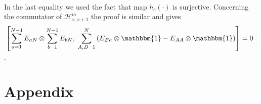 \documentclass[10pt]{article}
\numberwithin{equation}{section}
\numberwithin{equation}{subsection}
\newcommand{\dt}{\;.}
\begin{document}
{\begin{align*}
\end{align*}
In the last equality we used the fact that map $h_{c}(\cdot)$ is surjective. 
Concerning the commutator of $\mathcal{H}_{x,x+1}^{m}$ the proof is similar and gives
\begin{equation}
	\left[\sum_{a=1}^{N-1}E_{aN}\otimes \sum_{b=1}^{N-1}E_{bN},\;\sum_{A,B=1}^{N}\left(E_{B a}\otimes \mathbbm{1}-E_{AA}\otimes \mathbbm{1}\right)\right]=0\dt
\end{equation} 
\begin{flushright}
	$\square$
\end{flushright}













\appendix 
\section*{Appendix}
}
\end{document}
